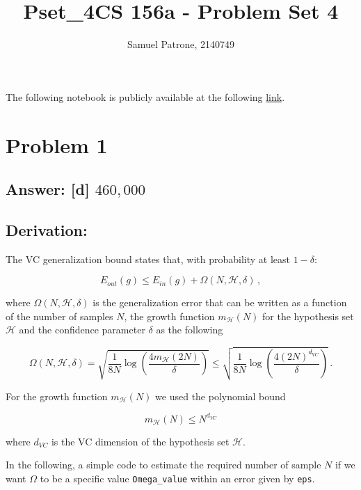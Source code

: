 \documentclass[11pt]{article}
\title{Pset\_4}
\begin{document}
    \title{CS 156a - Problem Set 4}
    \author{Samuel Patrone, 2140749}
    \maketitle
    

The following notebook is publicly available at the following
\href{https://github.com/spatrone/CS156A-Caltech.git}{link}.

\tableofcontents

    \hypertarget{problem-1}{%
\section{Problem 1}\label{problem-1}}

\hypertarget{answer-d-460000}{%
\subsection{\texorpdfstring{Answer: {[}d{]}
\(460,000\)}{Answer: {[}d{]} 460,000}}\label{answer-d-460000}}

\hypertarget{derivation}{%
\subsection{Derivation:}\label{derivation}}

The VC generalization bound states that, with probability at least
\(1-\delta\):

\[
E_{out}(g)\le E_{in}(g) + \Omega(N,\mathcal{H},\delta)\,,
\]

where \(\Omega(N,\mathcal{H},\delta)\) is the generalization error that
can be written as a function of the number of samples \(N\), the growth
function \(m_{\mathcal{H}}(N)\) for the hypothesis set \(\mathcal{H}\)
and the confidence parameter \(\delta\) as the following

\[
\Omega(N,\mathcal{H},\delta)=\sqrt{\frac{1}{8N}\log{\left(\frac{4 m_{\mathcal{H}}(2N)}{\delta}\right)}}\le \sqrt{\frac{1}{8N}\log{\left(\frac{4 (2N)^{d_{VC}}}{\delta}\right)}}\,.
\]

For the growth function \(m_{\mathcal{H}}(N)\) we used the polynomial
bound

\[
m_{\mathcal{H}}(N)\le N^{d_{VC}}
\]

where \(d_{VC}\) is the VC dimension of the hypothesis set
\(\mathcal{H}\).

In the following, a simple code to estimate the required number of
sample \(N\) if we want \(\Omega\) to be a specific value
\texttt{Omega\_value} within an error given by \texttt{eps}.
\end{document}
